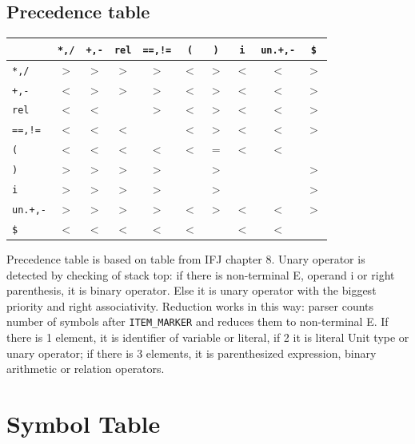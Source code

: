 \documentclass[12pt,a4paper]{article}
\begin{document}
\subsection{Precedence table}
\begin{table}[h!]
\centering
\begin{tabular}{|l|c|c|c|c|c|c|c|c|c|}
\hline
 & \texttt{*,/} & \texttt{+,-} & \texttt{rel} & \texttt{==,!=} & \texttt{(} & \texttt{)} & \texttt{i} & \texttt{un.+,-} & \texttt{\$} \\ \hline
\texttt{*,/}    & $>$ & $>$ & $>$ & $>$ & $<$ & $>$ & $<$ & $<$ & $>$ \\ \hline
\texttt{+,-}    & $<$ & $>$ & $>$ & $>$ & $<$ & $>$ & $<$ & $<$ & $>$ \\ \hline
\texttt{rel}    & $<$ & $<$ &     & $>$ & $<$ & $>$ & $<$ & $<$ & $>$ \\ \hline
\texttt{==,!=}  & $<$ & $<$ & $<$ &     & $<$ & $>$ & $<$ & $<$ & $>$ \\ \hline
\texttt{(}      & $<$ & $<$ & $<$ & $<$ & $<$ & $=$ & $<$ & $<$ &     \\ \hline
\texttt{)}      & $>$ & $>$ & $>$ & $>$ &     & $>$ &     &     & $>$ \\ \hline
\texttt{i}      & $>$ & $>$ & $>$ & $>$ &     & $>$ &     &     & $>$ \\ \hline
\texttt{un.+,-} & $>$ & $>$ & $>$ & $>$ & $<$ & $>$ & $<$ & $<$ & $>$ \\ \hline
\texttt{\$}     & $<$ & $<$ & $<$ & $<$ & $<$ &     & $<$ & $<$ &     \\ \hline
\end{tabular}
\end{table}

Precedence table is based on table from IFJ chapter 8. Unary operator is detected by checking of stack top: if there is non-terminal E, operand i or right parenthesis, it is binary operator. Else it is unary operator with the biggest priority and right associativity. Reduction works in this way: parser counts number of symbols after \texttt{ITEM\_MARKER} and reduces them to non-terminal E. If there is 1 element, it is identifier of variable or literal, if 2 it is literal Unit type or unary operator; if there is 3 elements, it is parenthesized expression, binary arithmetic or relation operators.

\section{Symbol Table}           
\end{document}
